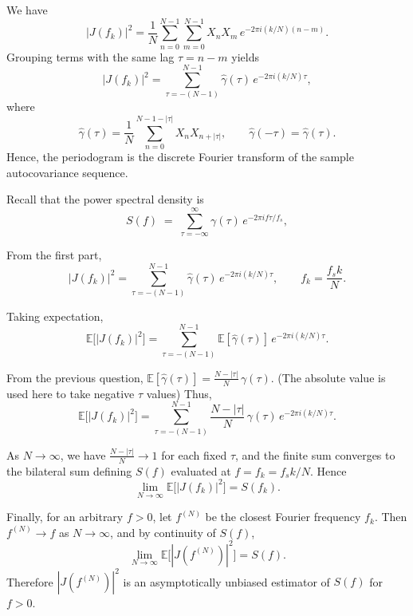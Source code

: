 \documentclass[11pt]{article}
\begin{document}
\begin{solution}
We have
\begin{equation*}
|J(f_k)|^2 
= \frac{1}{N}\sum_{n=0}^{N-1}\sum_{m=0}^{N-1}
X_n X_m\, e^{-2\pi i (k/N)(n-m)}.
\end{equation*}
Grouping terms with the same lag $\tau = n-m$ yields
\begin{equation*}
|J(f_k)|^2 
= \sum_{\tau=-(N-1)}^{N-1} 
\hat{\gamma}(\tau)\, e^{-2\pi i (k/N)\tau},
\end{equation*}
where 
\begin{equation*}
\hat{\gamma}(\tau)
= \frac{1}{N}\sum_{n=0}^{N-1-|\tau|} X_n X_{n+|\tau|},
\qquad
\hat{\gamma}(-\tau)=\hat{\gamma}(\tau).
\end{equation*}
Hence, the periodogram is the discrete Fourier transform of the sample autocovariance sequence.

Recall that the power spectral density is
\begin{equation*}
S(f) \;=\; \sum_{\tau=-\infty}^{\infty} \gamma(\tau)\,
e^{-2\pi i f \tau / f_s},
\end{equation*}

From the first part,
\begin{equation*}
|J(f_k)|^2 
= \sum_{\tau=-(N-1)}^{N-1} 
\hat{\gamma}(\tau)\, e^{-2\pi i (k/N)\tau},
\qquad
f_k = \frac{f_s k}{N}.
\end{equation*}

Taking expectation,
\begin{equation*}
\mathbb{E}\big[ |J(f_k)|^2 \big]
= \sum_{\tau=-(N-1)}^{N-1} 
\mathbb{E}[\hat{\gamma}(\tau)]\, e^{-2\pi i (k/N)\tau}.
\end{equation*}

From the previous question, $\mathbb{E}[\hat{\gamma}(\tau)]
= \frac{N-|\tau|}{N}\,\gamma(\tau)$. (The absolute value is used here to take negative $\tau$ values)
Thus,
\begin{equation*}
\mathbb{E}\big[ |J(f_k)|^2 \big]
= \sum_{\tau=-(N-1)}^{N-1} 
\frac{N-|\tau|}{N}\,\gamma(\tau)\,
e^{-2\pi i (k/N)\tau}.
\end{equation*}

As $N\to\infty$, we have $\frac{N-|\tau|}{N}\to 1$ for each fixed $\tau$, and
the finite sum converges to the bilateral sum defining $S(f)$ evaluated at 
$f = f_k = f_s k/N$. Hence
\begin{equation*}
\lim_{N\to\infty} 
\mathbb{E}\big[ |J(f_k)|^2 \big]
= S(f_k).
\end{equation*}

Finally, for an arbitrary $f>0$, let $f^{(N)}$ be the closest Fourier frequency
$f_k$. Then $f^{(N)} \to f$ as $N\to\infty$, and by continuity of $S(f)$,
\begin{equation*}
\lim_{N\to\infty} 
\mathbb{E}\big[ |J(f^{(N)})|^2 \big]
= S(f).
\end{equation*}
Therefore $|J(f^{(N)})|^2$ is an asymptotically unbiased estimator of $S(f)$
for $f>0$.

\end{solution}
\end{document}
